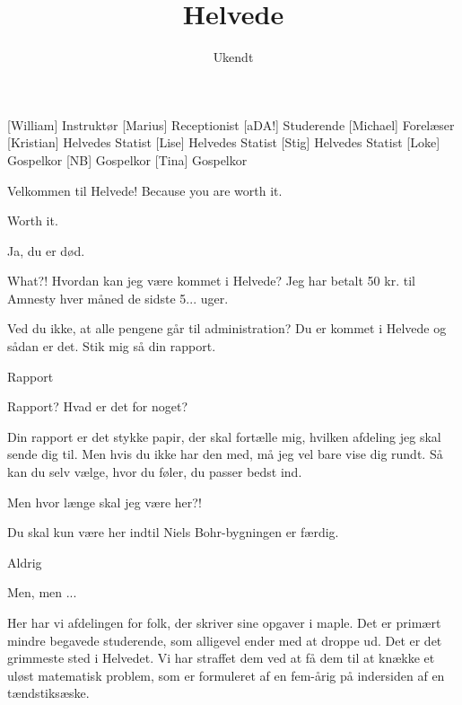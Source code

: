 \documentclass[a4paper,11pt]{article}
\title{Helvede}
\author{Ukendt}
\begin{document}
\maketitle

\begin{roles}
[William] Instruktør
[Marius] Receptionist
[aDA!] Studerende
[Michael] Forelæser
[Kristian] Helvedes Statist
[Lise] Helvedes Statist
[Stig] Helvedes Statist
[Loke] Gospelkor
[NB] Gospelkor
[Tina] Gospelkor
\end{roles}


\begin{sketch}

 Velkommen til Helvede! Because you are worth it.

 Worth it.

 Ja, du er død.

 What?! Hvordan kan jeg være kommet i Helvede? Jeg har betalt 50 kr. til Amnesty hver måned de sidste 5... uger.

 Ved du ikke, at alle pengene går til administration? Du er kommet i Helvede og sådan er det. Stik mig så din rapport.

 Rapport

 Rapport? Hvad er det for noget?

 Din rapport er det stykke papir, der skal fortælle mig, hvilken afdeling jeg skal sende dig til. Men hvis du ikke har den med, må jeg vel bare vise dig rundt. Så kan du selv
vælge, hvor du føler, du passer bedst ind.

 Men hvor længe skal jeg være her?!

 Du skal kun være her indtil Niels Bohr-bygningen er færdig.

 Aldrig

 Men, men ...


 Her har vi afdelingen for folk, der skriver sine opgaver i maple. Det er primært mindre begavede studerende, som alligevel ender med at droppe ud. Det er det grimmeste sted i Helvedet. Vi har straffet dem ved at få dem til at knække et uløst matematisk problem, som er formuleret af en fem-årig på indersiden af en tændstiksæske. 


\end{sketch}
\end{document}
